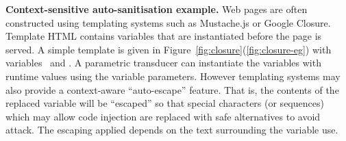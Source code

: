 \smallskip
\noindent \textbf{Context-sensitive auto-sanitisation example.} %
%
%
%
Web pages are often constructed using templating systems \cite{SSS11} such as Mustache.js or Google Closure.
Template HTML contains variables that are instantiated before the page is served.
A simple template is given in Figure~\ref{fig:closure}(\ref{fig:closure-eg}) with variables \linkvar\ and \linktextvar.
A parametric transducer can instantiate the variables with runtime values using the variable parameters.
However templating systems may also provide a context-aware ``auto-escape'' feature.
That is, the contents of the replaced variable will be ``escaped'' so that special characters (or sequences) which may allow code injection are replaced with safe alternatives to avoid attack.
The escaping applied depends on the text surrounding the variable use.

